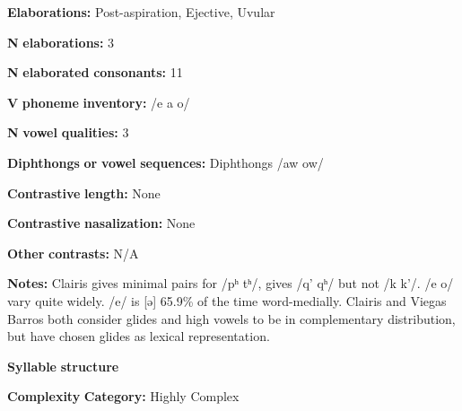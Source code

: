 \begin{styleBody}
\textbf{Elaborations:} Post-aspiration, Ejective, Uvular
\end{styleBody}

\begin{styleBody}
\textbf{N} \textbf{elaborations:} 3
\end{styleBody}

\begin{styleBody}
\textbf{N} \textbf{elaborated} \textbf{consonants:} 11
\end{styleBody}

\begin{styleBody}
\textbf{V} \textbf{phoneme} \textbf{inventory:} /e a o/
\end{styleBody}

\begin{styleBody}
\textbf{N} \textbf{vowel} \textbf{qualities:} 3
\end{styleBody}

\begin{styleBody}
\textbf{Diphthongs} \textbf{or} \textbf{vowel} \textbf{sequences:} Diphthongs /aw ow/
\end{styleBody}

\begin{styleBody}
\textbf{Contrastive} \textbf{length:} None
\end{styleBody}

\begin{styleBody}
\textbf{Contrastive} \textbf{nasalization:} None
\end{styleBody}

\begin{styleBody}
\textbf{Other} \textbf{contrasts:} N/A
\end{styleBody}

\begin{styleBody}
\textbf{Notes:} Clairis gives minimal pairs for /pʰ tʰ/, gives /q’ qʰ/ but not /k k’/. /e o/ vary quite widely. /e/ is [ə] 65.9\% of the time word-medially. Clairis and Viegas Barros both consider glides and high vowels to be in complementary distribution, but have chosen glides as lexical representation.
\end{styleBody}

\begin{styleBody}
\textbf{Syllable} \textbf{structure}
\end{styleBody}

\begin{styleBody}
\textbf{Complexity} \textbf{Category:} Highly Complex
\end{styleBody}

